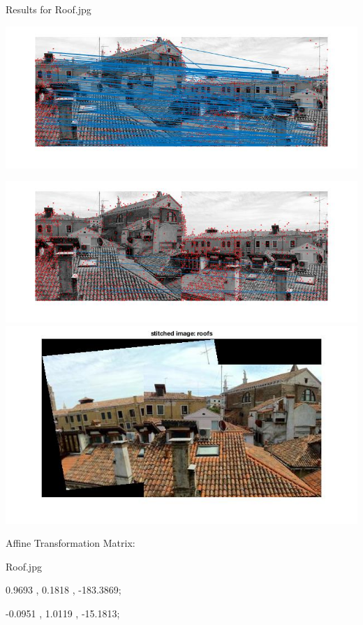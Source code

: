 \documentclass[fleqn]{article}
\begin{document}
Results for Roof.jpg
\begin{center}
\includegraphics[width=1.2\textwidth]{roof1.jpg}

\includegraphics[width=1.2\textwidth]{roof2.jpg}
\newline
\includegraphics[width=1.2\textwidth]{roof3.jpg}

Affine Transformation Matrix:
\vspace{10 mm}

Roof.jpg

0.9693   ,   0.1818   ,  -183.3869;

-0.0951  ,   1.0119   ,  -15.1813;

\end{center}

\newpage
\end{document}
